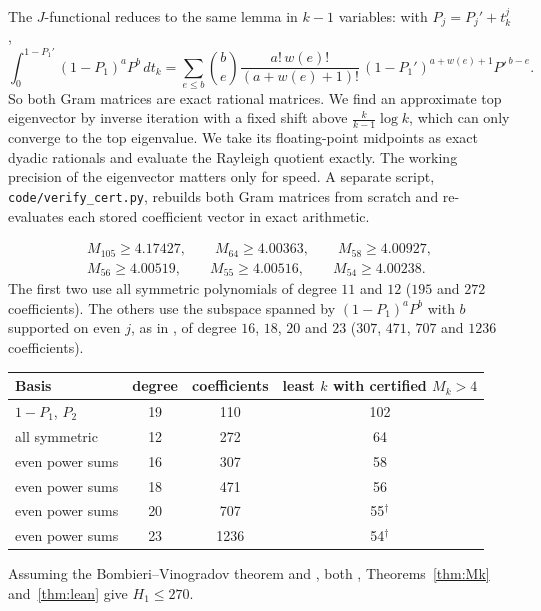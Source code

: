The $J$-functional reduces to the same lemma in $k-1$ variables: with
$P_j=P_j'+t_k^j$,
\[
\int_0^{1-P_1'}(1-P_1)^aP^b\,dt_k=\sum_{e\le b}\binom{b}{e}
\frac{a!\,w(e)!}{(a+w(e)+1)!}\,(1-P_1')^{a+w(e)+1}P'^{\,b-e}.
\]
So both Gram matrices are exact rational matrices. We find an approximate top
eigenvector by inverse iteration with a fixed shift above
$\frac{k}{k-1}\log k$, which can only converge to the top eigenvalue. We take
its floating-point midpoints as exact dyadic rationals and evaluate the
Rayleigh quotient exactly. The working precision of the eigenvector matters
only for speed. A separate script, \texttt{code/verify\_cert.py}, rebuilds
both Gram matrices from scratch and re-evaluates each stored coefficient
vector in exact arithmetic.

\begin{theorem}\label{thm:Mk}
\begin{gather*}
M_{105}\ge4.17427,\qquad M_{64}\ge4.00363,\qquad M_{58}\ge4.00927,\\
M_{56}\ge4.00519,\qquad M_{55}\ge4.00516,\qquad M_{54}\ge4.00238 .
\end{gather*}
The first two use all symmetric polynomials of degree $11$ and $12$
($195$ and $272$ coefficients). The others use the subspace spanned by
$(1-P_1)^aP^b$ with $b$ supported on even $j$, as in \cite[\S7]{Pol14b}, of
degree $16$, $18$, $20$ and $23$ ($307$, $471$, $707$ and $1236$ coefficients).
\end{theorem}

\begin{center}
\begin{tabular}{@{}lccc@{}}
\toprule
Basis & degree & coefficients & least $k$ with certified $M_k>4$\\
\midrule
$1-P_1$, $P_2$ & 19 & 110 & 102\\
all symmetric & 12 & 272 & 64\\
even power sums & 16 & 307 & 58\\
even power sums & 18 & 471 & 56\\
even power sums & 20 & 707 & 55$^{\dagger}$\\
even power sums & 23 & 1236 & 54$^{\dagger}$\\
\bottomrule
\end{tabular}
\end{center}

\begin{corollary}\label{cor:578}
Assuming the Bombieri--Vinogradov theorem and \cite[Prop.~4.2]{May15}, both
, Theorems~\ref{thm:Mk} and~\ref{thm:lean} give
$H_1\le270$.
\end{corollary}


